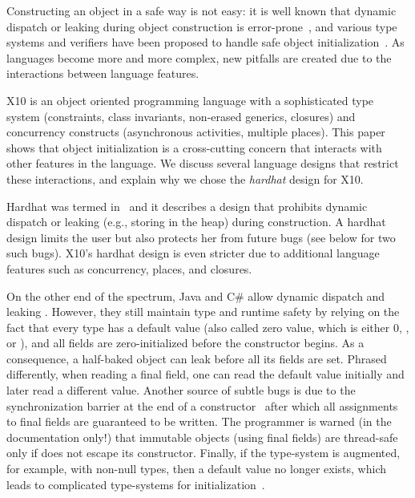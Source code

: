 Constructing an object in a safe way is not easy:
    it is well known that dynamic dispatch
    or leaking \this during object construction
    is error-prone~\cite{Dean:1996,Seo:2007:SBD:1522565.1522587,Gil:2009:WRS:1615184.1615216},
    and various type systems and verifiers have been proposed to
    handle safe object initialization~\cite{Hubert:2010:ESO:1888881.1888890,Zibin:2010:OIG:1869459.1869509,Fahndrich:2007:EOI:1297027.1297052,XinQi:2009}.
As languages become more and more complex,
    new pitfalls are created due to the interactions between
    language features.

X10 is an object oriented programming language with a sophisticated
    type system (constraints, class invariants, non-erased generics, closures)
    and concurrency constructs (asynchronous activities, multiple places).
This paper shows that object initialization is a cross-cutting concern
    that interacts with other features in the language.
We discuss several language designs that restrict these interactions,
    and explain why we chose the \emph{hardhat} design for X10.

{Hardhat} was termed in~\cite{Gil:2009:WRS:1615184.1615216}
    and it describes a design that prohibits dynamic dispatch
    or leaking \this (e.g., storing \this in the heap) during construction.
A hardhat design limits the user
    but also protects her from future bugs
    (see  below for two such bugs).
X10's hardhat design is even stricter due to additional language features
    such as concurrency, places, and closures.

On the other end of the spectrum,
    Java and C\# allow
    dynamic dispatch and leaking \this.
However, they still maintain type and runtime safety
    by relying on the fact that every type has a default value
    (also called zero value, which is either 0, , or ),
    and all fields are zero-initialized before the constructor begins.
As a consequence,
    a half-baked object can leak before all its fields are set. %
Phrased differently,
    when reading a final field, one can read the default value initially and later read a different value.
Another source of subtle bugs is due to the synchronization barrier
    at the end of a constructor~\cite{JSR133}
    after which all assignments to final fields are guaranteed to be written.
The programmer is warned (in the documentation only!)
    that immutable objects (using final fields) are thread-safe only if
    \this does not escape its constructor.
Finally, if the type-system is augmented, for example, with non-null types, then
    a default value no longer exists,
    which leads to complicated type-systems for initialization~\cite{Fahndrich:2007:EOI:1297027.1297052,XinQi:2009}.


